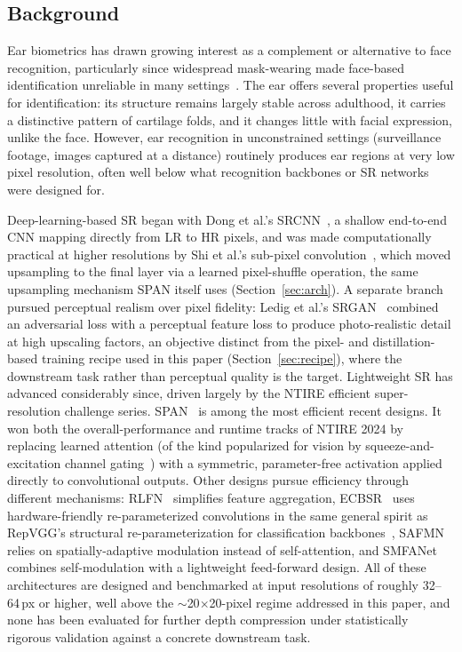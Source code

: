 \documentclass[pdflatex,sn-vancouver-num]{sn-jnl}
\begin{document}
\subsection{Background}

Ear biometrics has drawn growing interest as a complement or alternative to face recognition, particularly since widespread mask-wearing made face-based identification unreliable in many settings~\cite{mehta2023ear}. The ear offers several properties useful for identification: its structure remains largely stable across adulthood, it carries a distinctive pattern of cartilage folds, and it changes little with facial expression, unlike the face. However, ear recognition in unconstrained settings (surveillance footage, images captured at a distance) routinely produces ear regions at very low pixel resolution, often well below what recognition backbones or SR networks were designed for.

Deep-learning-based SR began with Dong et al.'s SRCNN~\cite{dong2016srcnn}, a shallow end-to-end CNN mapping directly from LR to HR pixels, and was made computationally practical at higher resolutions by Shi et al.'s sub-pixel convolution~\cite{shi2016espcn}, which moved upsampling to the final layer via a learned pixel-shuffle operation, the same upsampling mechanism SPAN itself uses (Section~\ref{sec:arch}). A separate branch pursued perceptual realism over pixel fidelity: Ledig et al.'s SRGAN~\cite{ledig2017srgan} combined an adversarial loss with a perceptual feature loss to produce photo-realistic detail at high upscaling factors, an objective distinct from the pixel- and distillation-based training recipe used in this paper (Section~\ref{sec:recipe}), where the downstream task rather than perceptual quality is the target. Lightweight SR has advanced considerably since, driven largely by the NTIRE efficient super-resolution challenge series. SPAN~\cite{wan2024span} is among the most efficient recent designs. It won both the overall-performance and runtime tracks of NTIRE 2024 by replacing learned attention (of the kind popularized for vision by squeeze-and-excitation channel gating~\cite{hu2018senet}) with a symmetric, parameter-free activation applied directly to convolutional outputs. Other designs pursue efficiency through different mechanisms: RLFN~\cite{kong2022rlfn} simplifies feature aggregation, ECBSR~\cite{zhang2021ecbsr} uses hardware-friendly re-parameterized convolutions in the same general spirit as RepVGG's structural re-parameterization for classification backbones~\cite{ding2021repvgg}, SAFMN~\cite{sun2023safmn} relies on spatially-adaptive modulation instead of self-attention, and SMFANet~\cite{zheng2024smfanet} combines self-modulation with a lightweight feed-forward design. All of these architectures are designed and benchmarked at input resolutions of roughly 32--64\,px or higher, well above the $\sim$20$\times$20-pixel regime addressed in this paper, and none has been evaluated for further depth compression under statistically rigorous validation against a concrete downstream task.
\end{document}
